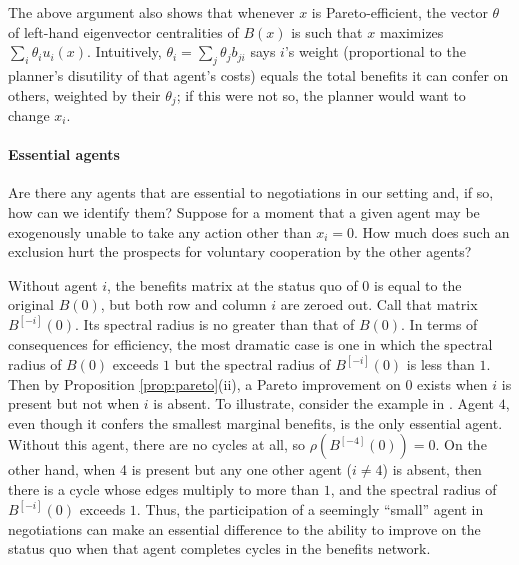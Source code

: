 \documentclass{notices}
\theoremstyle{definition}\newtheorem{problem}{Problem}
\begin{document}
The above argument also shows that whenever $x$ is Pareto-efficient, the vector ${\theta}$ of left-hand eigenvector centralities of ${B}({x})$ is such that ${x}$ maximizes $ \sum_i \theta_i u_i({x})$. Intuitively,  $\theta_i = \sum_j \theta_j b_{ji}$ says $i$'s weight (proportional to the planner's disutility of that agent's costs) equals the total benefits it can confer on others, weighted by their $\theta_j$; if this were not so, the planner would want to change $x_i$. 

\paragraph{Essential agents}




Are there any agents that are essential to negotiations in our setting and, if so, how can we identify them? Suppose for a moment that a given agent may be exogenously unable to take any action other than $x_i=0$. How much does such an exclusion hurt the prospects for voluntary cooperation by the other agents?


Without agent $i$, the benefits matrix at the status quo of ${0}$ is equal to the original ${B}({0})$, but both row and column $i$ are zeroed out. Call that matrix ${B}^{[-i]}({0})$. Its spectral radius is no greater than that of  ${B}({0}).$ In terms of consequences for efficiency, the most dramatic case is one in which the spectral radius of ${B}({0})$ exceeds $1$ but the spectral radius of  ${B}^{[-i]}({0})$ is less than $1$. Then by Proposition \ref{prop:pareto}(ii), a Pareto improvement on ${0}$ exists when $i$ is present but not when $i$ is absent. To illustrate, consider the  example in . Agent $4$, even though it confers the smallest marginal benefits, is the only essential agent. Without this agent, there are no cycles at all, so $\rho({B}^{[-4]}({0}))=0 $. On the other hand, when 4 is present but any one other agent ($i \neq 4$) is absent, then there is a cycle whose edges multiply to more than $1$, and the spectral radius of ${B}^{[-i]}({0})$ exceeds $1$.  Thus, the participation of a seemingly ``small'' agent in negotiations can make an essential difference to the ability to improve on the status quo when that agent completes cycles in the benefits network.
\end{document}
